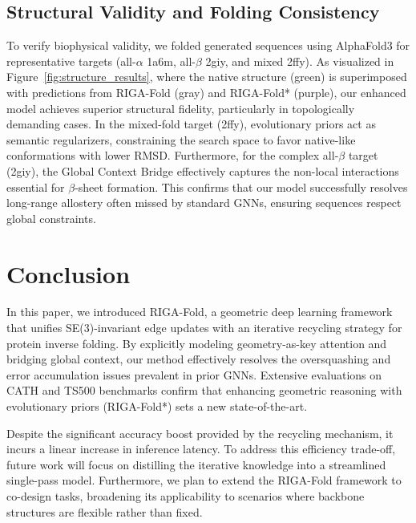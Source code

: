\documentclass{article}
\theoremstyle{plain}
\theoremstyle{definition}
\theoremstyle{remark}
\begin{document}
{\subsection{Structural Validity and Folding Consistency}

To verify biophysical validity, we folded generated sequences using AlphaFold3 for representative targets (all-$\alpha$ 1a6m, all-$\beta$ 2giy, and mixed 2ffy). As visualized in Figure~\ref{fig:structure_results}, where the native structure (green) is superimposed with predictions from RIGA-Fold (gray) and RIGA-Fold* (purple), our enhanced model achieves superior structural fidelity, particularly in topologically demanding cases. In the mixed-fold target (2ffy), evolutionary priors act as semantic regularizers, constraining the search space to favor native-like conformations with lower RMSD. Furthermore, for the complex all-$\beta$ target (2giy), the Global Context Bridge effectively captures the non-local interactions essential for $\beta$-sheet formation. This confirms that our model successfully resolves long-range allostery often missed by standard GNNs, ensuring sequences respect global constraints.

\section{Conclusion}
In this paper, we introduced RIGA-Fold, a geometric deep learning framework that unifies SE(3)-invariant edge updates with an iterative recycling strategy for protein inverse folding. By explicitly modeling geometry-as-key attention and bridging global context, our method effectively resolves the oversquashing and error accumulation issues prevalent in prior GNNs. Extensive evaluations on CATH and TS500 benchmarks confirm that enhancing geometric reasoning with evolutionary priors (RIGA-Fold*) sets a new state-of-the-art.

Despite the significant accuracy boost provided by the recycling mechanism, it incurs a linear increase in inference latency. To address this efficiency trade-off, future work will focus on distilling the iterative knowledge into a streamlined single-pass model. Furthermore, we plan to extend the RIGA-Fold framework to co-design tasks, broadening its applicability to scenarios where backbone structures are flexible rather than fixed.







}
\end{document}

